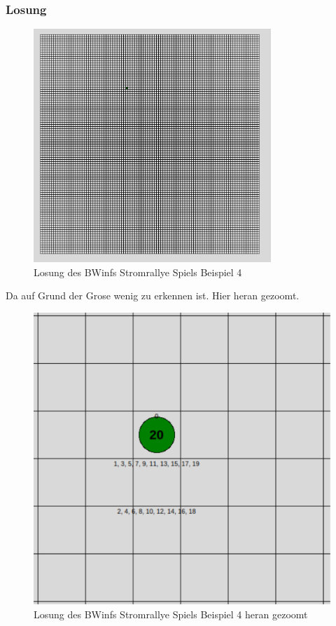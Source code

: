 \documentclass[a4paper,12pt,arial]{scrartcl}
\begin{document}
\subsubsection{Losung}
\begin{figure}[h]
    \centering
    \includegraphics[width=0.8\textwidth]{solution4.png}
    \caption{Losung des BWinfs Stromrallye Spiels Beispiel 4}
    \label{fig:loesung4}
\end{figure}
Da auf Grund der Grose wenig zu erkennen ist.
Hier heran gezoomt.
\begin{figure}[h]
    \centering
    \includegraphics[width=\textwidth]{solution_4_zoomed.pdf}
    \caption{Losung des BWinfs Stromrallye Spiels Beispiel 4 heran gezoomt}
    \label{fig:loesung4_zoomed}
\end{figure}
\end{document}
